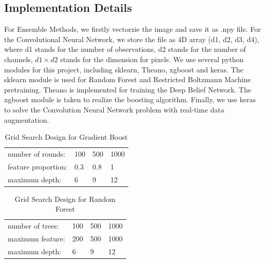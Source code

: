 \documentclass[11pt,oneside,a4paper]{article}
\numberwithin{equation}{section}
\begin{document}
\subsection*{Implementation Details}
For Ensemble Methods, we firstly vectorzie the image and save it as .npy file. For the Convolutional Neural Network, we store the file as 4D array (d1, d2, d3, d4), where d1 stands for the number of observations, d2 stands for the number of channels, $d1 \times d2$ stands for the dimension for pixels.
We use several python modules for this project, including sklearn, Theano, xgboost and keras. The sklearn module is used for Random Forest and Restricted Boltzmann Machine pretraining. Theano is implemented for training the Deep Belief Network. The xgboost module is taken to realize the boosting algorithm. Finally, we use keras to solve the Convolution Neural Network problem with real-time data augmentation.


\begin{table}[p]
\centering
\small
\caption{Grid Search Design for Gradient Boost}
\label{cv:gb}
\begin{tabular}{llll}
\toprule
number of rounds: & 100 & 500 & 1000 \\
feature proportion:     & 0.3 & 0.8 & 1   \\
maximum depth:    & 6   & 9   & 12  \\
\bottomrule
\end{tabular}
\end{table}

\begin{table}[p]
\centering
\small
\caption{Grid Search Design for Random Forest}
\label{cv:rf}
\begin{tabular}{llll}
\toprule
number of trees: & 100 & 500 & 1000 \\
maximum feature:     &200  & 500 & 1000   \\
maximum depth:    & 6   & 9   & 12  \\
\bottomrule
\end{tabular}
\end{table}
\end{document}

